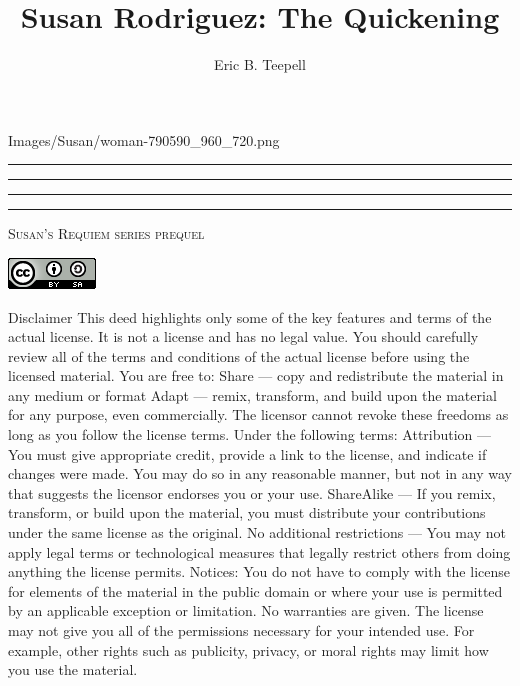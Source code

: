 \documentclass[12pt,twoside,onecolumn,openright,extrafontsizes]{memoir}
\title{Susan Rodriguez: The Quickening}
\author{Eric B. Teepell}
\newcommand{\press}{Susan's Requiem series prequel}
\newcommand*\halftitlepage{\begingroup %
  \setlength\drop{0.1\textheight}
  \begin{center}
  \vspace*{\drop}
  \rule{\textwidth}{0in}\par
  {\Large\textsc\thetitle\par}
  \rule{\textwidth}{0in}\par
  \vfill
  \end{center}
\endgroup}
\newlength\drop
\newcommand*\titleM{\begingroup %
  \setlength\drop{0.15\textheight}
  \begin{center}
  \vspace*{\drop}
  \rule{\textwidth}{0in}\par
  {\HUGE\textsc\thetitle\par}
  \rule{\textwidth}{0in}\par
  {\Large\textit\theauthor\par}
  \vfill
  {\Large\scshape\press}
  \end{center}
\endgroup}
\begin{document}
\pagestyle{empty}
 {Images/Susan/woman-790590_960_720.png}
\halftitlepage
\cleardoublepage
\titleM
\clearpage

\begin{center}
 	\centering
	\includegraphics[width=0.25\linewidth=0.25]{license.png}
\end{center}

\newpage
{\tiny Disclaimer This deed highlights only some of the key features and terms of the actual license. It is not a license and has no legal value. You should carefully review all of the terms and conditions of the actual license before using the licensed material. You are free to: Share — copy and redistribute the material in any medium or format Adapt — remix, transform, and build upon the material
for any purpose, even commercially. The licensor cannot revoke these freedoms as long as you follow the license terms. Under the following terms: Attribution — You must give appropriate credit, provide a link to the license, and indicate if changes were made. You may do so in any reasonable manner, but not in any way that suggests the licensor endorses you or your use. ShareAlike — If you remix, transform, or build upon the material, you must distribute your contributions under the same license as the original. No additional restrictions — You may not apply legal terms or technological measures that legally restrict others from doing anything the license permits. Notices: You do not have to comply with the license for elements of the material in the public domain or where your use is permitted by an applicable exception or limitation. No warranties are given. The license may not give you all of the permissions necessary for your intended use. For example, other rights such as publicity, privacy, or moral rights may limit how you use the material.
}
\clearpage
\end{document}
